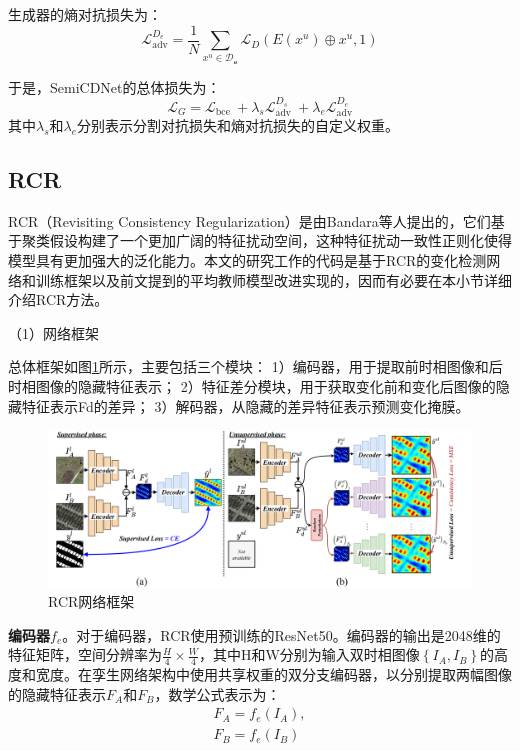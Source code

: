 \documentclass[lang=chs, degree=master, blindreview=false, adobe=false]{yanputhesis}
\begin{document}
生成器的熵对抗损失为：
\begin{equation}
  \label{eq:SemiCDNetLossDeadv}
  \mathcal{L}_{\mathrm{adv}}^{D_{e}}=\frac{1}{N} \sum_{x^{u} \in \mathcal{D}_{\mathcal{u}}} \mathcal{L}_{D}\left(E\left(x^{u}\right) \oplus x^{u}, 1\right)
\end{equation}

于是，SemiCDNet的总体损失为：
\begin{equation}
  \label{eq:SemiCDNetLosstotal}
  \mathcal{L}_{G}=\mathcal{L}_{\text {bce }}+\lambda_{s} \mathcal{L}_{\text {adv }}^{D_{s}}+\lambda_{e} \mathcal{L}_{\mathrm{adv}}^{D_{e}}
\end{equation}
其中$\lambda_{s}$和$\lambda_{e}$分别表示分割对抗损失和熵对抗损失的自定义权重。
\subsection{RCR}
RCR（Revisiting Consistency Regularization）是由Bandara等人\cite{bandara2022RCR}提出的，它们基于聚类假设构建了一个更加广阔的特征扰动空间，这种特征扰动一致性正则化使得模型具有更加强大的泛化能力。本文的研究工作的代码是基于RCR的变化检测网络和训练框架以及前文提到的平均教师模型改进实现的，因而有必要在本小节详细介绍RCR方法。

（1）网络框架

总体框架如图\ref{fig:RCRfram}所示，主要包括三个模块：
1）编码器，用于提取前时相图像和后时相图像的隐藏特征表示；
2）特征差分模块，用于获取变化前和变化后图像的隐藏特征表示Fd的差异；
3）解码器，从隐藏的差异特征表示预测变化掩膜。
\begin{figure}[htb]
  \centering
  \includegraphics[scale=0.45]{images/RCRframe.png}
  \caption{
    RCR网络框架\cite{bandara2022RCR}
  }
  \label{fig:RCRfram}
\end{figure}

\textbf{编码器$f_{e}$}。对于编码器，RCR使用预训练的ResNet50\cite{He2015ResNet}。编码器的输出是2048维的特征矩阵，空间分辨率为$\frac{H}{4} \times \frac{W}{4}$，其中H和W分别为输入双时相图像$\left \{ I_A, I_B \right \} $的高度和宽度。在孪生网络架构中使用共享权重的双分支编码器，以分别提取两幅图像的隐藏特征表示$F_A$和$F_B$，数学公式表示为：
\begin{equation}
  \label{eq:RCRencode}
  \begin{array}{l}
  F_{A}=f_{e}\left(I_{A}\right), \\
  F_{B}=f_{e}\left(I_{B}\right)
  \end{array}
\end{equation}
\end{document}
